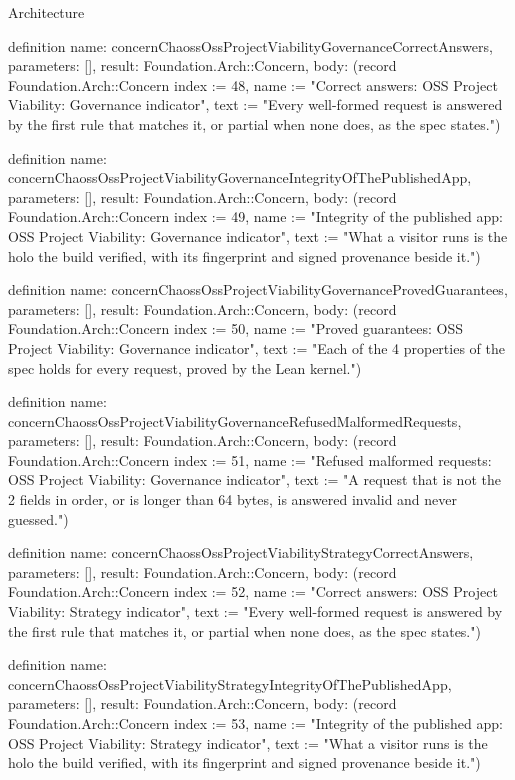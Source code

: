 \begin{lexlean}{Architecture}
\begin{semanticmodule}
definition{
  name: concernChaossOssProjectViabilityGovernanceCorrectAnswers,
  parameters: [],
  result: Foundation.Arch::Concern,
  body: (record Foundation.Arch::Concern {index := 48, name := "Correct answers: OSS Project Viability: Governance indicator", text := "Every well-formed request is answered by the first rule that matches it, or partial when none does, as the spec states."})
}

definition{
  name: concernChaossOssProjectViabilityGovernanceIntegrityOfThePublishedApp,
  parameters: [],
  result: Foundation.Arch::Concern,
  body: (record Foundation.Arch::Concern {index := 49, name := "Integrity of the published app: OSS Project Viability: Governance indicator", text := "What a visitor runs is the holo the build verified, with its fingerprint and signed provenance beside it."})
}

definition{
  name: concernChaossOssProjectViabilityGovernanceProvedGuarantees,
  parameters: [],
  result: Foundation.Arch::Concern,
  body: (record Foundation.Arch::Concern {index := 50, name := "Proved guarantees: OSS Project Viability: Governance indicator", text := "Each of the 4 properties of the spec holds for every request, proved by the Lean kernel."})
}

definition{
  name: concernChaossOssProjectViabilityGovernanceRefusedMalformedRequests,
  parameters: [],
  result: Foundation.Arch::Concern,
  body: (record Foundation.Arch::Concern {index := 51, name := "Refused malformed requests: OSS Project Viability: Governance indicator", text := "A request that is not the 2 fields in order, or is longer than 64 bytes, is answered invalid and never guessed."})
}

definition{
  name: concernChaossOssProjectViabilityStrategyCorrectAnswers,
  parameters: [],
  result: Foundation.Arch::Concern,
  body: (record Foundation.Arch::Concern {index := 52, name := "Correct answers: OSS Project Viability: Strategy indicator", text := "Every well-formed request is answered by the first rule that matches it, or partial when none does, as the spec states."})
}

definition{
  name: concernChaossOssProjectViabilityStrategyIntegrityOfThePublishedApp,
  parameters: [],
  result: Foundation.Arch::Concern,
  body: (record Foundation.Arch::Concern {index := 53, name := "Integrity of the published app: OSS Project Viability: Strategy indicator", text := "What a visitor runs is the holo the build verified, with its fingerprint and signed provenance beside it."})
}


\end{semanticmodule}
\end{lexlean}
